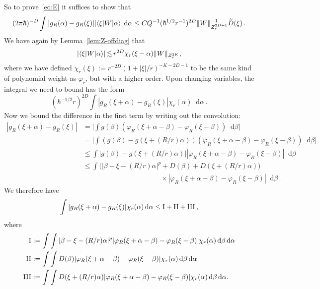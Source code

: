 \documentclass[11pt]{amsart}
\newcommand{\diff}{\mathop{}\!\mathrm{d}}
\def\lsim{{\,\lesssim\,}}
\def\Braket#1{\!\mathinner{\langle{#1}\rangle}\!}
\numberwithin{equation}{section}
\begin{document}
So to prove~\eqref{eq:E} it suffices to show that
\begin{equation}
\label{eq:integral-goal}
(2\pi\hbar)^{-D} \int |g_R(\alpha) -g_R(\xi)| |\Braket{\xi|W|\alpha}| \diff \alpha
\leq C Q^{-1} (\hbar^{1/2}r^{-1})^{2D} \|W\|_{Z^{2D+1}_r}^{-1} \widetilde{D}(\xi)\,.
\end{equation}
We have again by Lemma~\ref{lem:Z-offdiag} that
\[
|\Braket{\xi|W|\alpha}| \lsim r^{2D} \chi_r(\xi-\alpha) \|W\|_{Z^{2K}_r},
\]
where we have defined $\chi_r(\xi) := r^{-2D} (1+|\xi|/r)^{-K-2D-1}$ to be the same kind of
polynomial weight as $\varphi_r$, but with a higher order.
Upon changing variables, the integral we need to bound has the form
\[
(\hbar^{-1/2}r)^{2D} \int |g_R(\xi+\alpha) -g_R(\xi)| \chi_r(\alpha) \diff \alpha\,.
\]
Now we bound the difference in the first term by writing out the convolution:
\begin{align*}
|g_R(\xi+\alpha)-g_R(\xi)|
&= \Big| \int g(\beta) (\varphi_R(\xi+\alpha-\beta) - \varphi_R(\xi-\beta))\diff \beta\Big| \\
&= \Big| \int (g(\beta) - g(\xi+(R/r)\alpha)) (\varphi_R(\xi+\alpha-\beta) - \varphi_R(\xi-\beta))
\diff \beta\Big|  \\
&\leq \int |g(\beta) - g(\xi+(R/r)\alpha)| |\varphi_R(\xi+\alpha-\beta) - \varphi_R(\xi-\beta)|
\diff \beta \\
&\leq \int \Big(|\beta-\xi-(R/r)\alpha|^p + D(\beta) + D(\xi+(R/r)\alpha)\Big) \\
& \qquad \qquad \qquad \qquad \qquad \quad \, \times |\varphi_R(\xi+\alpha-\beta) - \varphi_R(\xi-\beta)| \diff \beta\,. 
\end{align*}
We therefore have
\[
\int |g_R(\xi+\alpha) -g_R(\xi)| \chi_r(\alpha) \diff \alpha \leq {\rm I} +
{\rm II} + {\rm III}\,,
\]
where
\begin{align}
\label{eq:I}
{\rm I} &:= \int \int|\beta-\xi-(R/r)\alpha|^p
|\varphi_R(\xi+\alpha-\beta) - \varphi_R(\xi-\beta)| \chi_r(\alpha)\diff \beta \diff \alpha
\\
\label{eq:II}
{\rm II} &:= \int \int D(\beta)
|\varphi_R(\xi+\alpha-\beta) - \varphi_R(\xi-\beta)| \chi_r(\alpha)\diff \beta \diff \alpha\\
\label{eq:III}
{\rm III} &:= \int \int D(\xi+(R/r)\alpha)
|\varphi_R(\xi+\alpha-\beta) - \varphi_R(\xi-\beta)| \chi_r(\alpha)\diff \beta \diff \alpha.
\end{align}
\end{document}
